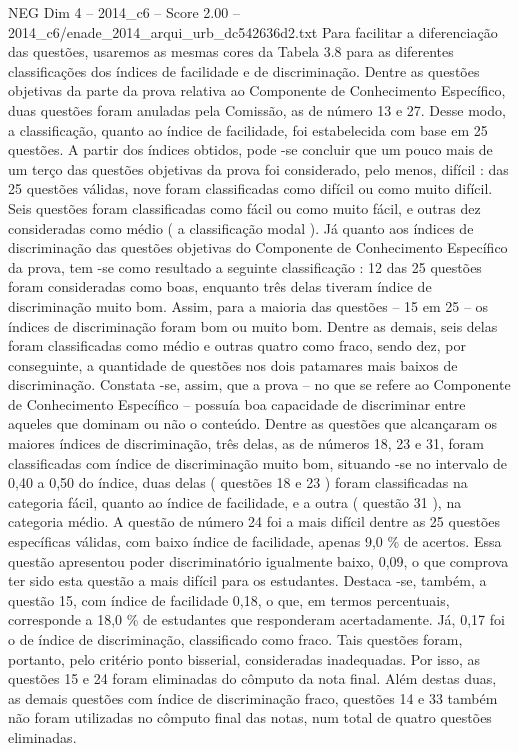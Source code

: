 \begin{textsample}{NEG Dim 4 – 2014\_c6 – Score 2.00 – 2014\_c6/enade\_2014\_arqui\_urb\_dc542636d2.txt}
Para facilitar a diferenciação das questões, usaremos as mesmas cores da Tabela 3.8 para as diferentes classificações dos índices de facilidade e de discriminação.
Dentre as questões objetivas da parte da prova relativa ao Componente de Conhecimento Específico, duas questões foram anuladas pela Comissão, as de número 13 e 27.
Desse modo, a classificação, quanto ao índice de facilidade, foi estabelecida com base em 25 questões.
A partir dos índices obtidos, pode -se concluir que um pouco mais de um terço das questões objetivas da prova foi considerado, pelo menos, difícil : das 25 questões válidas, nove foram classificadas como difícil ou como muito difícil.
Seis questões foram classificadas como fácil ou como muito fácil, e outras dez consideradas como médio ( a classificação modal ).
Já quanto aos índices de discriminação das questões objetivas do Componente de Conhecimento Específico da prova, tem -se como resultado a seguinte classificação : 12 das 25 questões foram consideradas como boas, enquanto três delas tiveram índice de discriminação muito bom.
Assim, para a maioria das questões – 15 em 25 – os índices de discriminação foram bom ou muito bom.
Dentre as demais, seis delas foram classificadas como médio e outras quatro como fraco, sendo dez, por conseguinte, a quantidade de questões nos dois patamares mais baixos de discriminação.
Constata -se, assim, que a prova – no que se refere ao Componente de Conhecimento Específico – possuía boa capacidade de discriminar entre aqueles que dominam ou não o conteúdo.
Dentre as questões que alcançaram os maiores índices de discriminação, três delas, as de números 18, 23 e 31, foram classificadas com índice de discriminação muito bom, situando -se no intervalo de 0,40 a 0,50 do índice, duas delas ( questões 18 e 23 ) foram classificadas na categoria fácil, quanto ao índice de facilidade, e a outra ( questão 31 ), na categoria médio.
A questão de número 24 foi a mais difícil dentre as 25 questões específicas válidas, com baixo índice de facilidade, apenas 9,0 \% de acertos.
Essa questão apresentou poder discriminatório igualmente baixo, 0,09, o que comprova ter sido esta questão a mais difícil para os estudantes.
Destaca -se, também, a questão 15, com índice de facilidade 0,18, o que, em termos percentuais, corresponde a 18,0 \% de estudantes que responderam acertadamente.
Já, 0,17 foi o de índice de discriminação, classificado como fraco.
Tais questões foram, portanto, pelo critério ponto bisserial, consideradas inadequadas.
Por isso, as questões 15 e 24 foram eliminadas do cômputo da nota final.
Além destas duas, as demais questões com índice de discriminação fraco, questões 14 e 33 também não foram utilizadas no cômputo final das notas, num total de quatro questões eliminadas.

\end{textsample}
